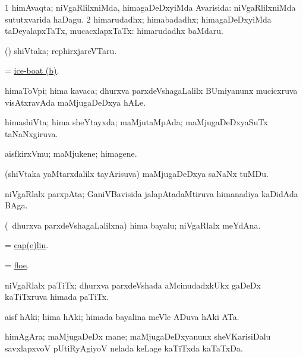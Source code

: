 \bentry
{}
\gl{\gu}
\bmng
\bnum
\num{1} himAvaqta; niVgaRlilxniMda, himagaDeDxyiMda Avarisida:  niVgaRlilxniMda sututxvarida haDagu. 
\num{2} himarudadhx; himabadadhx; himagaDeDxyiMda taDeyalapxTaTx, mucacxlapxTaTx:  himarudadhx baMdaru. 
\enum
\emng
\eentry

\bentry
{}
\gl{\nA}
\bmng
(\ame) shiVtaka; rephirxjareVTaru. 
\emng
\eentry

\bentry
{}
\gl{\nA}
\bmng
 = \hyperlink{ice-boat(b)}{ice-boat (b)}. 
\emng
\eentry

\bentry
{}
\gl{\nA}
\bmng
himaToVpi; hima kavaca; dhurxva parxdeVshagaLalilx BUmiyanunx mucicxruva visAtxravAda maMjugaDeDxya hALe. 
\emng
\eentry

\bentry
{}
\gl{\gu}
\bmng
himashiVta; hima sheYtayxda; maMjutaMpAda; maMjugaDeDxyaSuTx taNaNxgiruva. 
\emng
\eentry

\bentry
{}
\gl{\nA}
\bmng
aisfkirxVmu; maMjukene; himagene. 
\emng
\eentry

\bentry
{}
\gl{\nA}
\bmng
(shiVtaka yaMtarxdalilx tayArisuva) maMjugaDeDxya saNaNx tuMDu. 
\emng
\eentry

\bentry
{}
\gl{\nA}
\bmng
niVgaRlalx parxpAta; GaniVBavisida jalapAtadaMtiruva himanadiya kaDidAda BAga. 
\emng
\eentry

\bentry
{}
\gl{\nA}
\bmng
(\kanmu\ dhurxva parxdeVshagaLalilxna) hima bayalu; niVgaRlalx meYdAna. 
\emng
\eentry

\bentry
{}
\gl{\nA}
\bmng
= \hyperref{kandict_c.pdf}{C}{cap(e)lin}{cap(e)lin}. 
\emng
\eentry

\bentry
{}
\gl{\nA}
\bmng
= \hyperref{kandict_f.pdf}{F}{floe}{floe}. 
\emng
\eentry

\bentry
{}
\gl{\nA}
\bmng
niVgaRlalx paTiTx; dhurxva parxdeVshada aMcinudadxkUkx gaDeDx kaTiTxruva himada paTiTx. 
\emng
\eentry

\bentry
{}
\gl{\nA}
\bmng
aisf hAki; hima hAki; himada bayalina meVle ADuva hAki ATa. 
\emng
\eentry

\bentry
{}
\gl{\nA}
\bmng
himAgAra; maMjugaDeDx mane; maMjugaDeDxyanunx sheVKarisiDalu savxlapxvoV pUtiRyAgiyoV nelada keLage kaTiTxda kaTaTxDa. 
\emng
\eentry

